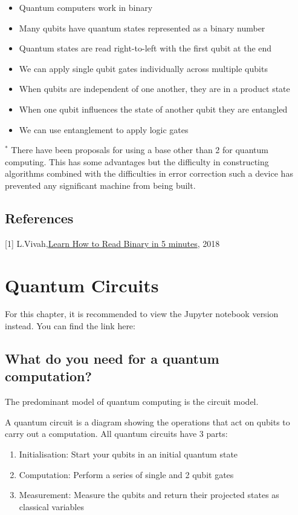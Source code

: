 \documentclass{book}
\begin{document}
\begin{itemize}
    \item Quantum computers work in binary
    \item Many qubits have quantum states represented as a binary number
    \item Quantum states are read right-to-left with the first qubit at the end
    \item We can apply single qubit gates individually across multiple qubits 
    \item When qubits are independent of one another, they are in a product state
    \item When one qubit influences the state of another qubit they are entangled 
    \item We can use entanglement to apply logic gates
\end{itemize}


$^*$ There have been proposals for using a base other than 2 for quantum computing. This has some advantages but the difficulty in constructing algorithms combined with the difficulties in error correction such a device has prevented any significant machine from being built.
\section{References}

[1] L.Vivah,\href{https://medium.com/@LindaVivah/learn-how-to-read-binary-in-5-minutes-dac1feb991e}{Learn How to Read Binary in 5 minutes}, 2018

\chapter{Quantum Circuits}

For this chapter, it is recommended to view the Jupyter notebook version instead. You can find the link here: 

\section{What do you need for a quantum computation?}

The predominant model of quantum computing is the circuit model. 

A quantum circuit is a diagram showing the operations that act on qubits to carry out a computation. All quantum circuits have 3 parts:

\begin{enumerate}
    \item Initialisation: Start your qubits in an initial quantum state
    \item Computation: Perform a series of single and 2 qubit gates
    \item Measurement: Measure the qubits and return their projected states as classical variables
\end{enumerate}
\end{document}
